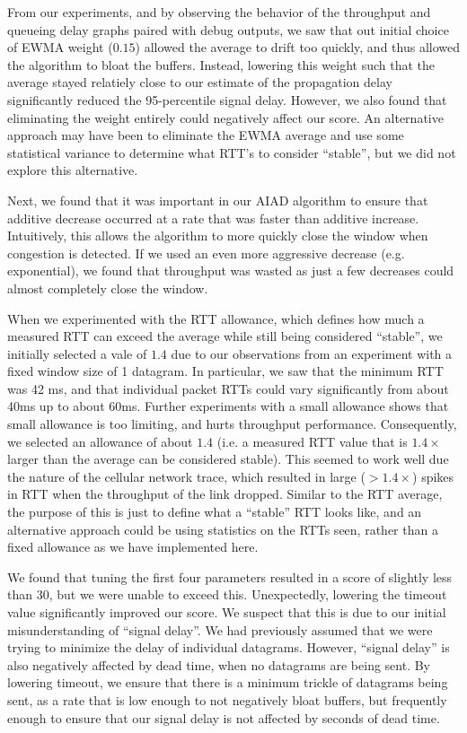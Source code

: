 \documentclass[twoside]{article}
\begin{document}
From our experiments, and by observing the behavior of the throughput and
queueing delay graphs paired with debug outputs, we saw that out initial
choice of EWMA weight ($0.15$) allowed the average to drift too quickly, and
thus allowed the algorithm to bloat the buffers. Instead, lowering this weight
such that the average stayed relatiely close to our estimate of the propagation
delay significantly reduced the 95-percentile signal delay. However, we also
found that eliminating the weight entirely could negatively affect our score.
An alternative approach may have been to eliminate the EWMA average and use
some statistical variance to determine what RTT's to consider ``stable'', but
we did not explore this alternative.

Next, we found that it was important in our AIAD algorithm to ensure that
additive decrease occurred at a rate that was faster than additive increase.
Intuitively, this allows the algorithm to more quickly close the window when
congestion is detected. If we used an even more aggressive decrease (e.g.
exponential), we found that throughput was wasted as just a few decreases could
almost completely close the window.

When we experimented with the RTT allowance, which defines how much a measured
RTT can exceed the average while still being considered ``stable'', we initially
selected a vale of $1.4$ due to our observations from an experiment with a
fixed window size of 1 datagram. In particular, we saw that the minimum RTT was
42 ms, and that individual packet RTTs could vary significantly from about 40ms
up to about 60ms. Further experiments with a small allowance shows that small
allowance is too limiting, and hurts throughput performance. Consequently, we
selected an allowance of about $1.4$ (i.e. a measured RTT value that is $1.4\times$
larger than the average can be considered stable). This seemed to work well due
the nature of the cellular network trace, which resulted in large ($>1.4\times$)
spikes in RTT when the throughput of the link dropped. Similar to the RTT
average, the purpose of this is just to define what a ``stable'' RTT looks like,
and an alternative approach could be using statistics on the RTTs seen, rather
than a fixed allowance as we have implemented here.

We found that tuning the first four parameters resulted in a score of slightly
less than 30, but we were unable to exceed this. Unexpectedly, lowering the
timeout value significantly improved our score. We suspect that this is due to
our initial misunderstanding of ``signal delay''. We had previously assumed
that we were trying to minimize the delay of individual datagrams. However,
``signal delay'' is also negatively affected by dead time, when no datagrams
are being sent. By lowering timeout, we ensure that there is a minimum trickle
of datagrams being sent, as a rate that is low enough to not negatively bloat
buffers, but frequently enough to ensure that our signal delay is not affected
by seconds of dead time.
\end{document}
